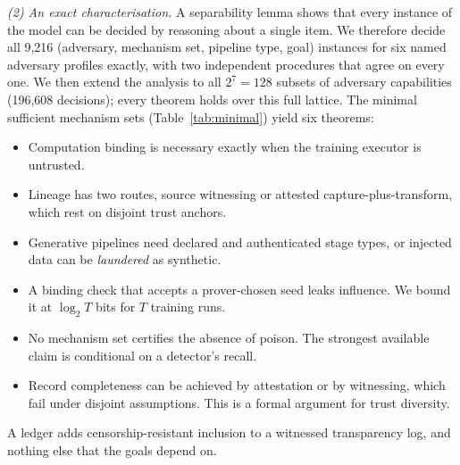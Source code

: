 \emph{(2) An exact characterisation.} A separability lemma shows that every instance of the
model can be decided by reasoning about a single item. We therefore decide all 9,216
(adversary, mechanism set, pipeline type, goal) instances for six named adversary profiles
exactly, with two independent procedures that agree on every one. We then extend the
analysis to all $2^7=128$ subsets of adversary capabilities (196,608 decisions); every
theorem holds over this full lattice. The minimal sufficient mechanism sets
(Table~\ref{tab:minimal}) yield six theorems:
\begin{itemize}
\item Computation binding is necessary exactly when the training executor is untrusted.
\item Lineage has two routes, source witnessing or attested capture-plus-transform, which
  rest on disjoint trust anchors.
\item Generative pipelines need declared and authenticated stage types, or injected data can
  be \emph{laundered} as synthetic.
\item A binding check that accepts a prover-chosen seed leaks influence. We bound it at
  $\log_2T$ bits for $T$ training runs.
\item No mechanism set certifies the absence of poison. The strongest available claim is
  conditional on a detector's recall.
\item Record completeness can be achieved by attestation or by witnessing, which fail under
  disjoint assumptions. This is a formal argument for trust diversity.
\end{itemize}
A ledger adds censorship-resistant inclusion to a witnessed transparency log, and nothing
else that the goals depend on.

